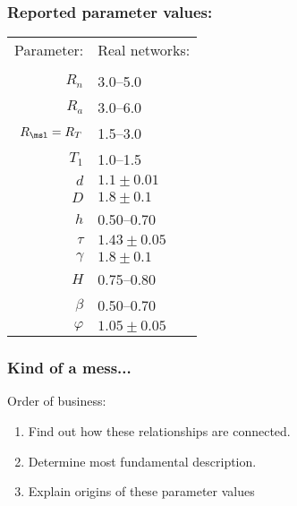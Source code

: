 \begin{frame}[label=]
  \frametitle{Reported parameter values:\cite{dodds1999a}}

  \begin{center}
    \begin{tabular}{rl}
      \alert{Parameter:}    & \alert{Real networks:}  \\
      &     \\
      $R_n$               & 3.0--5.0 \\
      $R_a$               & 3.0--6.0 \\
      $R_\msl=R_T$               & 1.5--3.0 \\
      $T_1$               & 1.0--1.5 \\
      ${d}$               & $1.1 \pm 0.01$ \\
      $D$                 & $1.8 \pm 0.1$ \\
      $h$                 & 0.50--0.70 \\
      $\tau$              & $1.43 \pm 0.05$ \\
      $\gamma$            & $1.8 \pm 0.1$ \\
      $H$                 & 0.75--0.80 \\
      $\beta$             & 0.50--0.70  \\
      $\varphi$           & $1.05 \pm 0.05$ \\
    \end{tabular}
  \end{center}

\end{frame}

\begin{frame}[label=]
  \frametitle{Kind of a mess...}

  \begin{block}{Order of business:}
    \begin{enumerate}
    \item<2-> Find out how these relationships are connected.
    \item<3-> Determine most fundamental description.
    \item<4-> Explain origins of these parameter values  \\
      \bigskip
    \end{enumerate}
  \end{block}

\end{frame}

